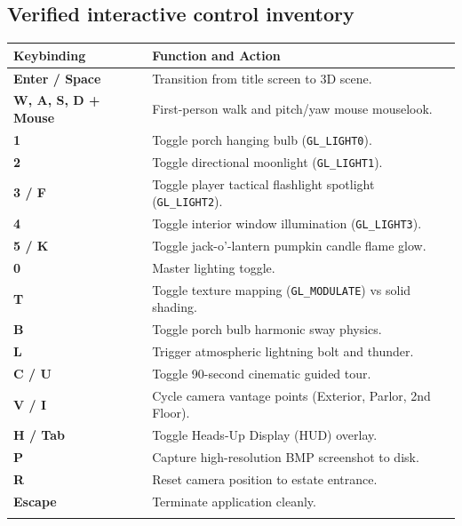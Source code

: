 \documentclass[10pt,a4paper,oneside]{article}
\begin{document}
\subsection{Verified interactive control inventory}
\begin{longtable}{p{}p{}}\toprule\textbf{Keybinding} & \textbf{Function and Action}\\\midrule\endhead

\textbf{Enter / Space} & Transition from title screen to 3D scene.\\\addlinespace[3pt]
\textbf{W, A, S, D + Mouse} & First-person walk and pitch/yaw mouse mouselook.\\\addlinespace[3pt]
\textbf{1} & Toggle porch hanging bulb (\texttt{GL\_LIGHT0}).\\\addlinespace[3pt]
\textbf{2} & Toggle directional moonlight (\texttt{GL\_LIGHT1}).\\\addlinespace[3pt]
\textbf{3 / F} & Toggle player tactical flashlight spotlight (\texttt{GL\_LIGHT2}).\\\addlinespace[3pt]
\textbf{4} & Toggle interior window illumination (\texttt{GL\_LIGHT3}).\\\addlinespace[3pt]
\textbf{5 / K} & Toggle jack-o'-lantern pumpkin candle flame glow.\\\addlinespace[3pt]
\textbf{0} & Master lighting toggle.\\\addlinespace[3pt]
\textbf{T} & Toggle texture mapping (\texttt{GL\_MODULATE}) vs solid shading.\\\addlinespace[3pt]
\textbf{B} & Toggle porch bulb harmonic sway physics.\\\addlinespace[3pt]
\textbf{L} & Trigger atmospheric lightning bolt and thunder.\\\addlinespace[3pt]
\textbf{C / U} & Toggle 90-second cinematic guided tour.\\\addlinespace[3pt]
\textbf{V / I} & Cycle camera vantage points (Exterior, Parlor, 2nd Floor).\\\addlinespace[3pt]
\textbf{H / Tab} & Toggle Heads-Up Display (HUD) overlay.\\\addlinespace[3pt]
\textbf{P} & Capture high-resolution BMP screenshot to disk.\\\addlinespace[3pt]
\textbf{R} & Reset camera position to estate entrance.\\\addlinespace[3pt]
\textbf{Escape} & Terminate application cleanly.\\\addlinespace[3pt]

\bottomrule\end{longtable}
\end{document}
